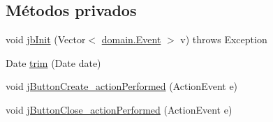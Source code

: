 \subsection*{Métodos privados}
\begin{DoxyCompactItemize}
\item 
void \mbox{\hyperlink{classgui_1_1CreateQuestionGUI_a7e0dc7e52c38f32c7f5ae3e41449d4f8}{jb\+Init}} (Vector$<$ \mbox{\hyperlink{classdomain_1_1Event}{domain.\+Event}} $>$ v)  throws Exception   
\item 
Date \mbox{\hyperlink{classgui_1_1CreateQuestionGUI_a9eb6017713f37b1600dbe23a0fdb3a95}{trim}} (Date date)
\item 
void \mbox{\hyperlink{classgui_1_1CreateQuestionGUI_ad1f4e3d488a30569844cad5d62fc31bc}{j\+Button\+Create\+\_\+action\+Performed}} (Action\+Event e)
\item 
void \mbox{\hyperlink{classgui_1_1CreateQuestionGUI_a9abbdb8a214e4c578ea5858fc1f52fc1}{j\+Button\+Close\+\_\+action\+Performed}} (Action\+Event e)
\end{DoxyCompactItemize}
